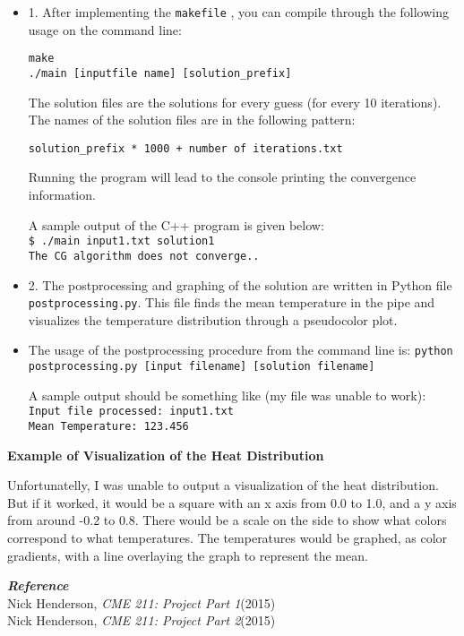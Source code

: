 \documentclass[12pt]{article} %
\begin{document}
\begin{itemize}

\item 1. After implementing the \texttt{makefile} , you can compile through the following usage on the command line:

\smallskip
\texttt{make\\}
\texttt{./main [inputfile name] [solution\_prefix]}
\bigskip

The solution files are the solutions for every guess (for every 10 iterations). The names of the solution files are in the following pattern:
\begin{center}
\texttt{solution\_prefix * 1000 + number of iterations.txt\\}
\end{center}
Running the program will lead to the console printing the convergence information.

A sample output of the C++ program is given below:
\smallskip\\
\texttt{\$ ./main input1.txt solution1\\
The CG algorithm does not converge..}
\smallskip

\item 2. The postprocessing and graphing of the solution are written in Python file \texttt{postprocessing.py}. This file finds the mean temperature in the pipe and visualizes the temperature distribution through a pseudocolor plot. 

\item The usage of the postprocessing procedure from the command line is:
\smallskip
\texttt{python postprocessing.py [input filename] [solution filename]}
\smallskip

A sample output should be something like (my file was unable to work):
\bigskip\\
\texttt{Input file processed: input1.txt\\Mean Temperature: 123.456\\}
\end{itemize}

\noindent
\textbf{\Large{Example of Visualization of the Heat Distribution}}

Unfortunatelly, I was unable to output a visualization of the heat distribution. But if it worked, it would be a square with an x axis from 0.0 to 1.0, and a y axis from around -0.2 to 0.8. There would be a scale on the side to show what colors correspond to what temperatures. The temperatures would be graphed, as color gradients, with a line overlaying the graph to represent the mean. 

\newpage
\noindent
\textbf{\textit{\Large{Reference}}}
\bigskip
\\Nick Henderson, \textit{CME 211: Project Part 1}(2015)\\
Nick Henderson, \textit{CME 211: Project Part 2}(2015)
\end{document}
